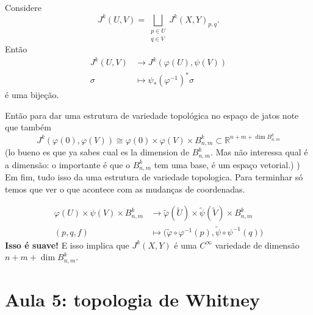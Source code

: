 \begin{exercise}\leavevmode
Considere
\[J^k(U,V)= \bigsqcup_{\substack{p \in U \\ q \in V}}J^k(X,Y)_{p,q}.\]
Então
\begin{align*}
	J^k(U,V) &\longrightarrow J^k(\varphi(U),\psi(V)) \\
	\sigma &\longmapsto \psi_*(\varphi^{-1})^*\sigma
\end{align*}
é uma bijeção.
\end{exercise}
Então para dar uma estrutura de variedade topológica no espaço de jatos note que também
\[J^k(\varphi(0),\varphi(V))\cong \varphi(0) \times \varphi(V) \times B^k_{n,m}\subset \mathbb{R}^{n+m+ \dim B^k_{n,m}}\]
(lo bueno es que ya sabes cual es la dimension de \(B^k_{n,m}\). Mas não interessa qual é a dimensão: o importante é que o \(B^k_{n,m}\) tem uma base, é um espaço vetorial.)
)
Em fim, tudo isso da uma estrutura de variedade topologica. Para terminhar só temos que ver o que acontece com as mudanças de coordenadas.

\begin{align*}
	\varphi(U) \times \psi(V) \times B^k_{n,m}  &\longrightarrow \tilde{\varphi}(\tilde{U})\times \tilde{\psi}(\tilde{V}) \times B^k_{n,m} \\
	(p,q,f) &\longmapsto \Big(\tilde{\varphi} \circ \varphi^{-1}(p),\tilde{\psi} \circ \psi^{-1}(q) \Big)
\end{align*}
\textbf{Isso é suave!} E isso implica que \(J^k(X,Y)\) é uma \(C^\infty\) variedade de dimensão \(n+m+ \dim B^k_{n,m}\). 


\section{Aula 5: topologia de Whitney}

